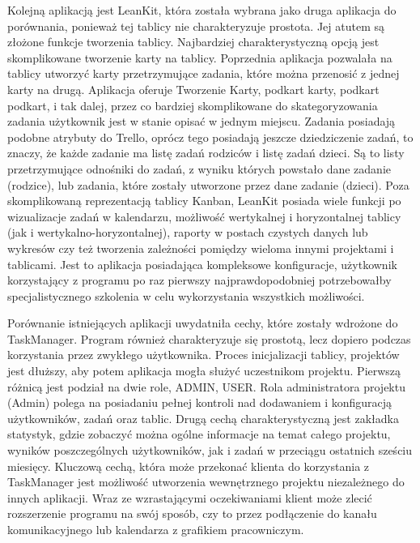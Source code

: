 \indent  Kolejną aplikacją jest LeanKit, która została wybrana jako druga aplikacja do porównania, ponieważ tej tablicy nie charakteryzuje prostota. Jej atutem są złożone funkcje tworzenia tablicy. Najbardziej charakterystyczną opcją jest skomplikowane tworzenie karty na tablicy. Poprzednia aplikacja pozwalała na tablicy utworzyć karty przetrzymujące zadania, które można przenosić z jednej karty na drugą. Aplikacja oferuje Tworzenie Karty, podkart karty, podkart podkart, i tak dalej, przez co bardziej skomplikowane do skategoryzowania zadania użytkownik jest w stanie opisać w jednym miejscu. Zadania posiadają podobne atrybuty do Trello, oprócz tego posiadają jeszcze dziedziczenie zadań, to znaczy, że każde zadanie ma listę zadań rodziców i listę zadań dzieci. Są to listy przetrzymujące odnośniki do zadań, z wyniku których powstało dane zadanie (rodzice), lub zadania, które zostały utworzone przez dane zadanie (dzieci). 
Poza skomplikowaną reprezentacją tablicy Kanban, LeanKit posiada wiele funkcji po wizualizacje zadań w kalendarzu, możliwość wertykalnej i horyzontalnej tablicy (jak i wertykalno-horyzontalnej), raporty w postach czystych danych lub wykresów czy też tworzenia zależności pomiędzy wieloma innymi projektami i tablicami.
Jest to aplikacja posiadająca kompleksowe konfiguracje, użytkownik korzystający z programu po raz pierwszy najprawdopodobniej potrzebowałby specjalistycznego szkolenia w celu wykorzystania wszystkich możliwości.


\indent Porównanie istniejących aplikacji uwydatniła cechy, które zostały wdrożone do TaskManager. Program również charakteryzuje się prostotą, lecz dopiero podczas korzystania przez zwykłego użytkownika. Proces inicjalizacji tablicy, projektów jest dłuższy, aby potem aplikacja mogła służyć uczestnikom projektu.
Pierwszą różnicą jest podział na dwie role, ADMIN, USER. Rola administratora projektu (Admin) polega na posiadaniu pełnej kontroli nad dodawaniem i konfiguracją użytkowników, zadań oraz tablic.
Drugą cechą charakterystyczną jest zakładka statystyk, gdzie zobaczyć można ogólne informacje na temat całego projektu, wyników poszczególnych użytkowników, jak i zadań w przeciągu ostatnich sześciu miesięcy.
Kluczową cechą, która może przekonać klienta do korzystania z TaskManager jest możliwość utworzenia wewnętrznego projektu niezależnego do innych aplikacji. Wraz ze wzrastającymi oczekiwaniami klient może zlecić rozszerzenie programu na swój sposób, czy to przez podłączenie do kanału komunikacyjnego lub kalendarza z grafikiem pracowniczym.






